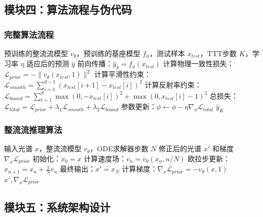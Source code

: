 \documentclass[12pt, a4paper]{article}
\begin{document}
\subsection{模块四：算法流程与伪代码}

\subsubsection{完整算法流程}
\begin{algorithm}[H]
\caption{Phys-PRL-Flow 测试时自适应算法}
\begin{algorithmic}[1]
\REQUIRE 预训练的整流流模型 $v_\theta$，预训练的基座模型 $f_\phi$，测试样本 $x_{test}$，TTT步数 $K$，学习率 $\eta$
\ENSURE 适应后的预测 $\hat{y}$
    \STATE 前向传播：$\hat{y}_k = f_\phi(x_{test})$
    \STATE 计算物理一致性损失：$\mathcal{L}_{prior} = -\|v_\theta(x_{test}, 1)\|^2$
    \STATE 计算平滑性约束：$\mathcal{L}_{smooth} = \sum_{i=1}^{d-1} (x_{test}[i+1] - x_{test}[i])^2$
    \STATE 计算反射率约束：$\mathcal{L}_{bound} = \sum_{i=1}^{d} \max(0, -x_{test}[i])^2 + \max(0, x_{test}[i] - 1)^2$
    \STATE 总损失：$\mathcal{L}_{total} = \mathcal{L}_{prior} + \lambda_1 \mathcal{L}_{smooth} + \lambda_2 \mathcal{L}_{bound}$
    \STATE 参数更新：$\phi \leftarrow \phi - \eta \nabla_\phi \mathcal{L}_{total}$
\ENDFOR
\RETURN $\hat{y}_K$
\end{algorithmic}
\end{algorithm}

\subsubsection{整流流推理算法}
\begin{algorithm}[H]
\caption{整流流推理与梯度计算}
\begin{algorithmic}[1]
\REQUIRE 输入光谱 $x$，整流流模型 $v_\theta$，ODE求解器步数 $N$
\ENSURE 修正后的光谱 $x'$ 和梯度 $\nabla_x \mathcal{L}_{prior}$
\STATE 初始化：$x_0 = x$
    \STATE 计算速度场：$v_n = v_\theta(x_n, n/N)$
    \STATE 欧拉步更新：$x_{n+1} = x_n + \frac{1}{N} v_n$
\ENDFOR
\STATE 最终输出：$x' = x_N$
\STATE 计算梯度：$\nabla_x \mathcal{L}_{prior} = -v_\theta(x, 1)$
\RETURN $x', \nabla_x \mathcal{L}_{prior}$
\end{algorithmic}
\end{algorithm}

\subsection{模块五：系统架构设计}
\end{document}
